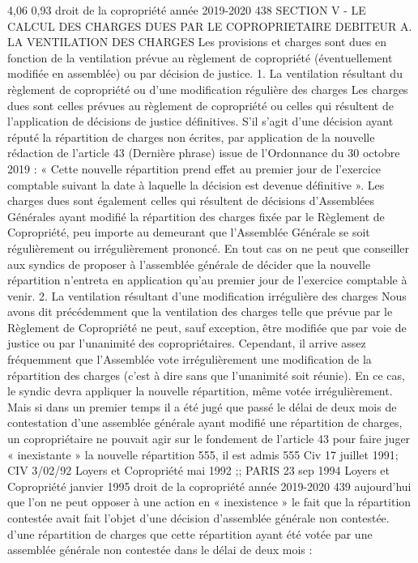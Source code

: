 4,06 %
0,93 %
droit de la copropriété année 2019-2020
438
SECTION V - LE CALCUL DES CHARGES DUES PAR LE COPROPRIETAIRE DEBITEUR
A. LA VENTILATION DES CHARGES
Les provisions et charges sont dues en fonction de la ventilation prévue au règlement de copropriété (éventuellement modifiée en assemblée) ou par décision de justice.
1. La ventilation résultant du règlement de copropriété ou d’une modification régulière des charges
Les charges dues sont celles prévues au règlement de copropriété ou celles qui résultent de l'application de décisions de justice définitives.
S’il s’agit d’une décision ayant réputé la répartition de charges non écrites, par application de la nouvelle rédaction de l’article 43 (Dernière phrase) issue de l’Ordonnance du 30 octobre 2019 : « Cette nouvelle répartition prend effet au premier jour de l'exercice comptable suivant la date à laquelle la décision est devenue définitive ».
Les charges dues sont également celles qui résultent de décisions d’Assemblées Générales ayant modifié la répartition des charges fixée par le Règlement de Copropriété, peu importe au demeurant que l’Assemblée Générale se soit régulièrement ou irrégulièrement prononcé. En tout cas on ne peut que conseiller aux syndics de proposer à l’assemblée générale de décider que la nouvelle répartition n’entreta en application qu’au premier jour de l’exercice comptable à venir.
2. La ventilation résultant d’une modification irrégulière des charges
Nous avons dit précédemment que la ventilation des charges telle que prévue par le Règlement de Copropriété ne peut, sauf exception, être modifiée que par voie de justice ou par l'unanimité des copropriétaires. Cependant, il arrive assez fréquemment que l'Assemblée vote irrégulièrement une modification de la répartition des charges (c'est à dire sans que l'unanimité soit réunie).
En ce cas, le syndic devra appliquer la nouvelle répartition, même votée irrégulièrement.
Mais si dans un premier temps il a été jugé que passé le délai de deux mois de contestation d’une assemblée générale ayant modifié une répartition de charges, un copropriétaire ne pouvait agir sur le fondement de l’article 43 pour faire juger « inexistante » la nouvelle répartition 555, il est admis
555 Civ 17 juillet 1991; CIV 3/02/92 Loyers et Copropriété mai 1992 ;; PARIS 23 sep 1994 Loyers et Copropriété janvier 1995 
droit de la copropriété année 2019-2020
439
aujourd’hui que l’on ne peut opposer à une action en « inexistence » le fait que la répartition contestée avait fait l’objet d’une décision d’assemblée générale non contestée. d’une répartition de charges que cette répartition ayant été votée par une assemblée générale non contestée dans le délai de deux mois :
